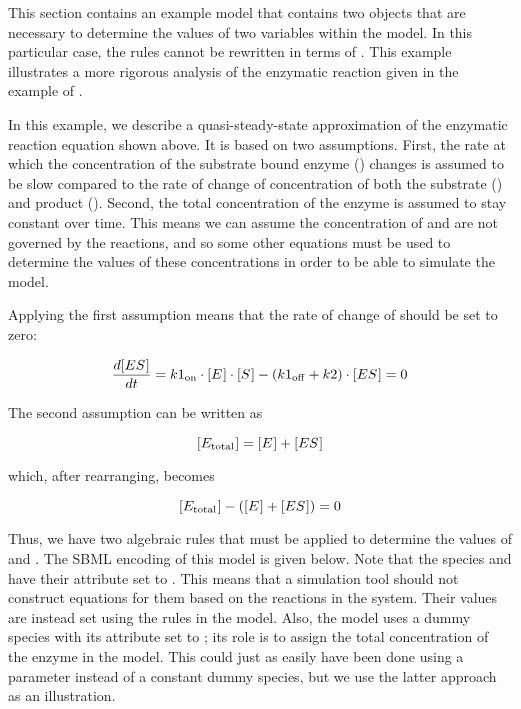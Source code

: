 This section contains an example model that contains two
\AlgebraicRule objects that are necessary to determine the values
of two variables within the model.  In this particular case, the
rules cannot be rewritten in terms of \AssignmentRule.  This
example illustrates a more rigorous analysis of the enzymatic
reaction given in the example of .
\begin{center}
\end{center}
In this example, we describe a quasi-steady-state approximation of
the enzymatic reaction equation shown above.  It is based on two
assumptions.  First, the rate at which the concentration of the
substrate bound enzyme () changes is assumed to be
slow compared to the rate of change of concentration of both the
substrate () and product ().  Second, the
total concentration of the enzyme is assumed to stay constant over
time.  This means we can assume the concentration of 
and  are not governed by the reactions, and so some
other equations must be used to determine the values of these
concentrations in order to be able to simulate the model.

Applying the first assumption means that the rate of change of
 should be set to zero:
\begin{linenomath}
\begin{equation*}
  \dfrac{d \concent{ES}}{d t} = k1\sub{on} \cdot \concent{E} \cdot \concent{S}
     - (k1\sub{off} + k2) \cdot \concent{ES} = 0
\end{equation*}
\end{linenomath}

The second assumption can be written as
\begin{linenomath}
\begin{equation*}
  \concent{E\sub{total}} = \concent{E} + \concent{ES}
\end{equation*}
\end{linenomath}
which, after rearranging, becomes
\begin{linenomath}
\begin{equation*}
  \concent{E\sub{total}} - (\concent{E} + \concent{ES}) = 0
\end{equation*}
\end{linenomath}

Thus, we have two algebraic rules that must be applied to
determine the values of  and .  The SBML
encoding of this model is given below.  Note that the species
 and  have their 
attribute set to .  This means that a simulation tool
should not construct equations for them based on the reactions in
the system.  Their values are instead set using the rules in the
model.  Also, the model uses a dummy species
 with its  attribute set to
; its role is to assign the total concentration of the
enzyme in the model.  This could just as easily have been done
using a parameter instead of a constant dummy species, but we use
the latter approach as an illustration.

